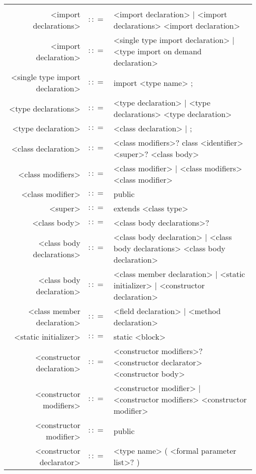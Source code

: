 \documentclass[landscape]{article}
\begin{document}
\begin{center}
	\begin{longtable}{r c L{15cm}}
											&					&	 \\
		<import declarations>						&	$\colon\colon=$	&	<import declaration> | <import declarations> <import declaration>
		\\
		<import declaration>						&	$\colon\colon=$	&	<single type import declaration> | <type import on demand declaration>
		\\
		<single type import declaration>			&	$\colon\colon=$	&	import <type name> ;
		\\
		<type declarations>							&	$\colon\colon=$	&	<type declaration> | <type declarations> <type declaration>
		\\
		<type declaration>							&	$\colon\colon=$	&	<class declaration> | ;
		\\
		<class declaration>							&	$\colon\colon=$	&	<class modifiers>? class <identifier> <super>? <class body>
		\\
		<class modifiers>							&	$\colon\colon=$	&	<class modifier> | <class modifiers> <class modifier>
		\\
		<class modifier>							&	$\colon\colon=$	&	public
		\\
		<super>										&	$\colon\colon=$	&	extends <class type>
		\\
		<class body>								&	$\colon\colon=$	&	{ <class body declarations>? }
		\\
		<class body declarations>					&	$\colon\colon=$	&	<class body declaration> | <class body declarations> <class body declaration>
		\\
		<class body declaration>					&	$\colon\colon=$	&	<class member declaration> | <static initializer> | <constructor declaration>
		\\
		<class member declaration>					&	$\colon\colon=$	&	<field declaration> | <method declaration>
		\\
		<static initializer>						&	$\colon\colon=$	&	static <block>
		\\
		<constructor declaration>					&	$\colon\colon=$	&	<constructor modifiers>? <constructor declarator> <constructor body>
		\\
		<constructor modifiers>						&	$\colon\colon=$	&	<constructor modifier> | <constructor modifiers> <constructor modifier>
		\\
		<constructor modifier>						&	$\colon\colon=$	&	public
		\\
		<constructor declarator>					&	$\colon\colon=$	&	<type name> ( <formal parameter list>? )

\end{longtable}
\end{center}
\end{document}
